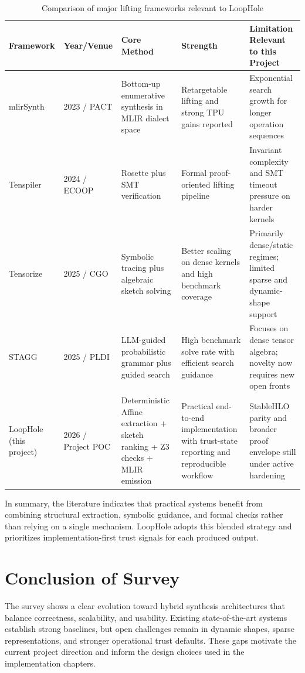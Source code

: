 \begin{table}[H]
\centering
\caption{Comparison of major lifting frameworks relevant to LoopHole}
\begin{tabular}{|p{2.3cm}|p{2.2cm}|p{3.0cm}|p{3.5cm}|p{3.8cm}|}
\hline
\textbf{Framework} & \textbf{Year/Venue} & \textbf{Core Method} & \textbf{Strength} & \textbf{Limitation Relevant to this Project} \\
\hline
mlirSynth & 2023 / PACT & Bottom-up enumerative synthesis in MLIR dialect space & Retargetable lifting and strong TPU gains reported & Exponential search growth for longer operation sequences \cite{mlirsynth} \\
\hline
Tenspiler & 2024 / ECOOP & Rosette plus SMT verification & Formal proof-oriented lifting pipeline & Invariant complexity and SMT timeout pressure on harder kernels \cite{tenspiler} \\
\hline
Tensorize & 2025 / CGO & Symbolic tracing plus algebraic sketch solving & Better scaling on dense kernels and high benchmark coverage & Primarily dense/static regimes; limited sparse and dynamic-shape support \cite{tensorize} \\
\hline
STAGG & 2025 / PLDI & LLM-guided probabilistic grammar plus guided search & High benchmark solve rate with efficient search guidance & Focuses on dense tensor algebra; novelty now requires new open fronts \cite{stagg} \\
\hline
LoopHole (this project) & 2026 / Project POC & Deterministic Affine extraction + sketch ranking + Z3 checks + MLIR emission & Practical end-to-end implementation with trust-state reporting and reproducible workflow & StableHLO parity and broader proof envelope still under active hardening \\
\hline
\end{tabular}
\end{table}

In summary, the literature indicates that practical systems benefit from combining structural extraction, symbolic guidance, and formal checks rather than relying on a single mechanism. LoopHole adopts this blended strategy and prioritizes implementation-first trust signals for each produced output.

\section{Conclusion of Survey}
The survey shows a clear evolution toward hybrid synthesis architectures that balance correctness, scalability, and usability. Existing state-of-the-art systems establish strong baselines, but open challenges remain in dynamic shapes, sparse representations, and stronger operational trust defaults. These gaps motivate the current project direction and inform the design choices used in the implementation chapters.
